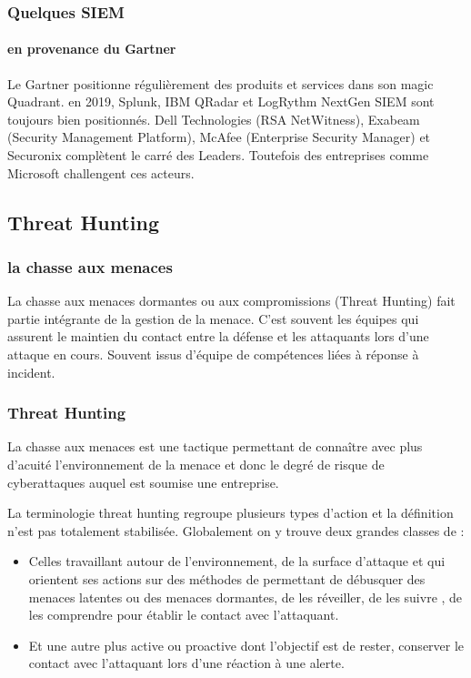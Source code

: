 \begin{frame}
\frametitle<presentation>{Quelques SIEM}
\framesubtitle<presentation>{en provenance du Gartner}
Le Gartner positionne régulièrement des produits et services dans son magic Quadrant. en 2019, Splunk, IBM QRadar et LogRythm NextGen SIEM sont toujours bien positionnés.
Dell Technologies (RSA NetWitness), Exabeam (Security Management Platform), McAfee (Enterprise Security Manager) et Securonix complètent le carré des Leaders.
Toutefois des entreprises comme Microsoft challengent ces acteurs.
\end{frame}




\subsection{Threat Hunting}

\subsubsection{la chasse aux menaces}

La chasse aux menaces dormantes ou aux compromissions (Threat Hunting) fait partie intégrante de la gestion de la menace. 
C'est souvent les équipes  qui assurent le maintien du contact entre la défense et les attaquants lors d'une attaque en cours. Souvent issus d'équipe de compétences liées à réponse à incident.


\begin{frame}
\frametitle<presentation>{Threat Hunting}
La chasse aux menaces est une tactique permettant de connaître avec plus d'acuité l'environnement de la menace et donc  le degré de risque de cyberattaques auquel est soumise une entreprise. 

La terminologie threat hunting regroupe plusieurs types d'action et la définition n'est pas totalement stabilisée. Globalement on y trouve deux grandes classes de  :

\begin{itemize}
  \item Celles travaillant autour de l'environnement, de la surface d'attaque et qui orientent ses actions sur des méthodes de  permettant de débusquer des menaces latentes ou des menaces dormantes, de les réveiller, de les suivre , de les comprendre pour établir le contact avec l'attaquant.

  \item Et une autre plus active ou proactive dont l'objectif est de rester, conserver le contact avec l'attaquant lors d'une réaction à une alerte.
\end{itemize}


\end{frame}


